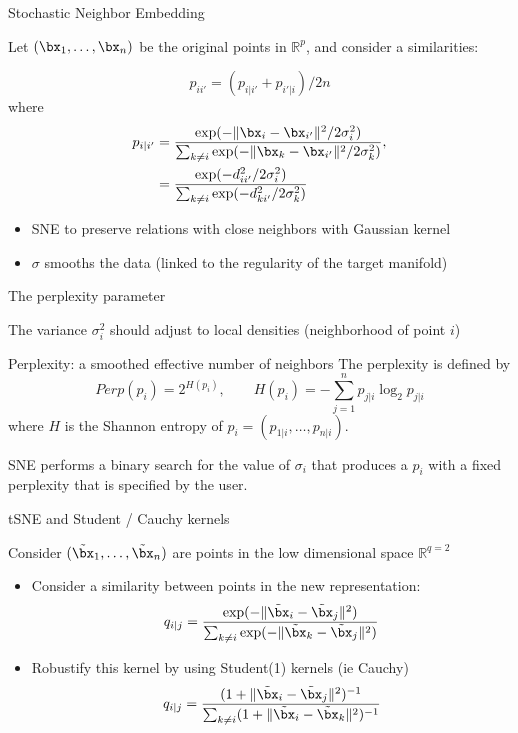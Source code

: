 \documentclass{beamer}\usepackage[]{graphicx}\usepackage[]{color}
\begin{document}
\begin{frame}{Stochastic Neighbor Embedding}

Let $(\bx_1, \hdots, \bx_n)$ be the original points in $\mathbb{R}^p$, and consider a similarities:

\[p_{i{i'}} =  (p_{i | {i'}} + p_{{i'} | i})/ 2n\]
where
\begin{align*}
  p_{i | {i'}} & = \frac{ \exp(- \| \bx_i - \bx_{i'} \|^2 / 2 \sigma_i^2 ) }{\sum_{k \neq i} \exp(- \| \bx_k - \bx_{i'} \|^2 / 2 \sigma_k^2)}, \\
  & = \frac{ \exp(- d_{ii'}^2 / 2 \sigma_i^2 ) }{\sum_{k \neq i} \exp(- d_{ki'}^2 / 2 \sigma_k^2)}
\end{align*}

\vfill

\begin{itemize}
\item[\rsa] SNE to preserve relations with close neighbors with Gaussian kernel
\item[\rsa] $\sigma$ smooths the data (linked to the regularity of the target manifold)
\end{itemize}

\end{frame}

\begin{frame}{The perplexity parameter}

The variance $\sigma_i^2$ should adjust to local densities (neighborhood of point $i$)

\begin{block}{Perplexity: a smoothed effective number of neighbors}
The perplexity is defined by
$$
  Perp(p_i) = 2^{H(p_i)}, \qquad H(p_i) = -\sum_{j=1}^{n} p_{j|i} \log_2 p_{j|i}
$$
where $H$ is the Shannon entropy of $p_i=(p_{1|i},\hdots,p_{n|i})$.\\
\end{block}

\vfill

\rsa SNE performs a binary search for the value of $\sigma_i$ that produces a $p_i$ with a fixed perplexity that is specified by the user.

\end{frame}

\begin{frame}{tSNE and Student / Cauchy kernels}

Consider $(\tilde\bx_1,\hdots,\tilde\bx_n)$ are points in the low dimensional space $\mathbb{R}^{q=2}$

\begin{itemize}
\item Consider a similarity between points in the new representation:
$$q_{i | j} = \frac{ \exp(- \| \tilde\bx_i - \tilde\bx_j \|^2  ) }{\sum_{k \neq i} \exp(- \| \tilde\bx_k - \tilde\bx_j \|^2 )}$$
\item Robustify this kernel by using Student(1) kernels (ie Cauchy)
$$q_{i | j} = \frac{ (1 + \| \tilde\bx_i - \tilde\bx_j \|^2)^{-1}  }{\sum_{k \neq i} (1 + \| \tilde\bx_i - \tilde\bx_k \|^2)^{-1}}$$
\end{itemize}
\end{frame}
\end{document}
